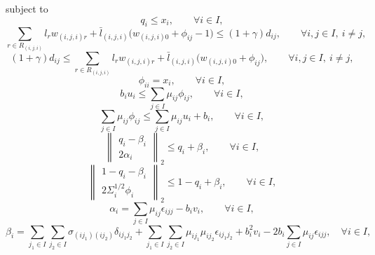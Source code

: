 \documentclass[11pt,a4paper]{article}
\begin{document}
subject to
\begin{equation}
q_i \le x_i,
\qquad \forall i \in I,
\tag{M2}
\end{equation}
\begin{equation}
\sum_{r \in R_{(i,j,i)}} l_r w_{(i,j,i)r}
+ \bar{l}_{(i,j,i)} \big(w_{(i,j,i)0} + \phi_{ij} - 1\big)
\le (1+\gamma) d_{ij},
\qquad \forall i,j \in I,\ i \neq j,
\tag{M3}
\end{equation}
\begin{equation}
(1+\gamma) d_{ij}
\le
\sum_{r \in R_{(i,j,i)}} l_r w_{(i,j,i)r}
+ \bar{l}_{(i,j,i)} \big(w_{(i,j,i)0} + \phi_{ij}\big),
\qquad \forall i,j \in I,\ i \neq j,
\tag{M4}
\end{equation}
\begin{equation}
\phi_{ii} = x_i,
\qquad \forall i \in I,
\tag{M5}
\end{equation}
\begin{equation}
b_i u_i \le \sum_{j \in I} \mu_{ij} \phi_{ij},
\qquad \forall i \in I,
\tag{M6}
\end{equation}
\begin{equation}
\sum_{j \in I} \mu_{ij} \phi_{ij}
\le
\sum_{j \in I} \mu_{ij} u_i + b_i,
\qquad \forall i \in I,
\tag{M7}
\end{equation}
\begin{equation}
\left\lVert
\begin{array}{c}
q_i - \beta_i \\
2 \alpha_i
\end{array}
\right\rVert_2
\le q_i + \beta_i,
\qquad \forall i \in I,
\tag{M8}
\end{equation}
\begin{equation}
\left\lVert
\begin{array}{c}
1 - q_i - \beta_i \\
2 \Sigma_i^{1/2} \phi_i
\end{array}
\right\rVert_2
\le 1 - q_i + \beta_i,
\qquad \forall i \in I,
\tag{M9}
\end{equation}
\begin{equation}
\alpha_i = \sum_{j \in I} \mu_{ij} \epsilon_{ijj} - b_i v_i,
\qquad \forall i \in I,
\tag{M10}
\end{equation}
\begin{equation}
\beta_i =
\sum_{j_1 \in I} \sum_{j_2 \in I} \sigma_{(ij_1)(ij_2)} \delta_{ij_1 j_2}
+ \sum_{j_1 \in I} \sum_{j_2 \in I} \mu_{ij_1}\mu_{ij_2} \epsilon_{ij_1 j_2}
+ b_i^2 v_i
- 2 b_i \sum_{j \in I} \mu_{ij} \epsilon_{ijj},
\quad \forall i \in I,
\tag{M11}
\end{equation}
\end{document}
